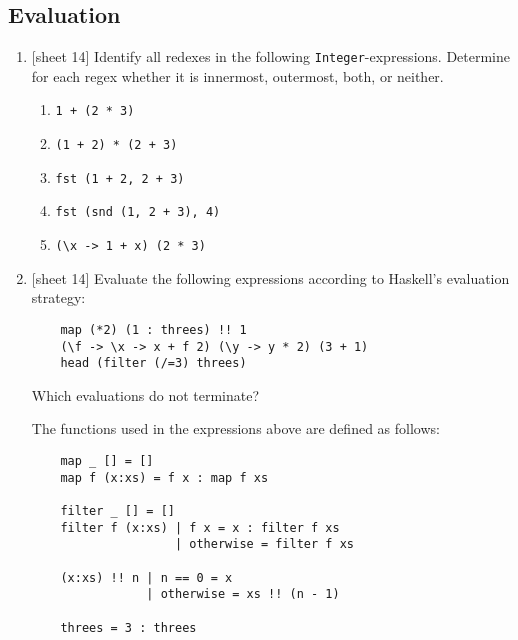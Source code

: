 \documentclass{article}
\def\code#1{\texttt{#1}}
\begin{document}
\subsection{Evaluation}
\begin{enumerate}
    \item {[sheet 14]} Identify all redexes in the following \code{Integer}-expressions. Determine for each regex whether it is innermost, outermost, both, or neither.
        \begin{enumerate}
            \item \code{1 + (2 * 3)}
            \item \code{(1 + 2) * (2 + 3)}
            \item \code{fst (1 + 2, 2 + 3)}
            \item \code{fst (snd (1, 2 + 3), 4)}
            \item \code{(\textbackslash x -> 1 + x) (2 * 3)}
        \end{enumerate}

    \item {[sheet 14]} Evaluate the following expressions according to Haskell's evaluation strategy:
        \begin{verbatim}
    map (*2) (1 : threes) !! 1
    (\f -> \x -> x + f 2) (\y -> y * 2) (3 + 1)
    head (filter (/=3) threes)
        \end{verbatim}
        Which evaluations do not terminate? \par
        The functions used in the expressions above are defined as follows:
        \begin{verbatim}
    map _ [] = []
    map f (x:xs) = f x : map f xs

    filter _ [] = []
    filter f (x:xs) | f x = x : filter f xs
                    | otherwise = filter f xs

    (x:xs) !! n | n == 0 = x
                | otherwise = xs !! (n - 1)

    threes = 3 : threes
        \end{verbatim}
\end{enumerate}
\end{document}
